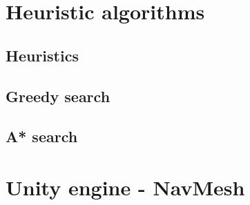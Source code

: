 \documentclass{beamer}
\begin{document}
\section{Heuristic algorithms}

\subsection{Heuristics}

\subsection{Greedy search}

\subsection{A* search}


\section{Unity engine - NavMesh}
\end{document}
